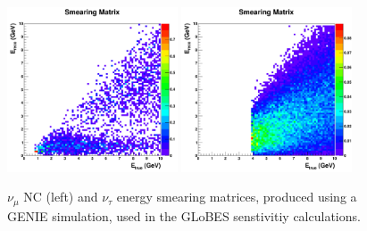 \documentclass[letterpaper,11pt]{article}
\begin{document}
\begin{figure}[!htb]
  \centering
  \includegraphics[width=0.45\textwidth]{figs/LBNE_smear_NC_all.pdf}
  \includegraphics[width=0.45\textwidth]{figs/tau_smear_prd.pdf}
  \caption{$\nu_{\mu}$ NC (left) and $\nu_{\tau}$ energy smearing matrices, produced
  using a GENIE simulation, used in the GLoBES senstivitiy calculations.}
  \label{fig:smear_inputs}
\end{figure}
\end{document}
